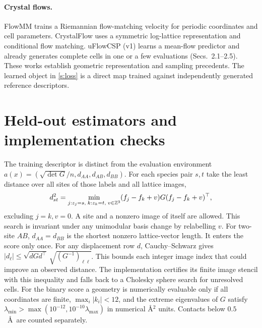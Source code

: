 \paragraph{Crystal flows.}
FlowMM \cite{flowmm} trains a Riemannian flow-matching velocity for periodic coordinates and cell parameters. CrystalFlow \cite{crystalflow} uses a symmetric log-lattice representation and conditional flow matching. uFlowCSP \cite{uflow} (v1) learns a mean-flow predictor and already generates complete cells in one or a few evaluations (Secs.~2.1--2.5). These works establish geometric representation and sampling precedents. The learned object in \eqref{s:loss} is a direct map trained against independently generated reference descriptors.

\newpage
\section{Held-out estimators and implementation checks}
The training descriptor is distinct from the evaluation environment
$a(x)=(\sqrt{\det G}/n,d_{AA},d_{AB},d_{BB})$.
For each species pair $s,t$ take the least distance over all sites of those labels and all lattice images,
\[
 d_{st}^2=\min_{j:z_j=s,\;k:z_k=t,\;v\in\mathbb Z^3}
       (f_j-f_k+v)G(f_j-f_k+v)^\top ,
\]
excluding $j=k,v=0$. A site and a nonzero image of itself are allowed. This search is invariant under any unimodular basis change by relabelling $v$. For two-site $AB$, $d_{AA}=d_{BB}$ is the shortest nonzero lattice-vector length. It enters the score only once. For any displacement row $d$, Cauchy--Schwarz gives $|d_\ell|\leq\sqrt{dGd^\top}\,\sqrt{(G^{-1})_{\ell\ell}}$. This bounds each integer image index that could improve an observed distance. The implementation certifies its finite image stencil with this inequality and falls back to a Cholesky sphere search for unresolved cells. For the binary score a geometry is numerically evaluable only if all coordinates are finite, $\max_i|k_i|<12$, and the extreme eigenvalues of $G$ satisfy $\lambda_{\min}>\max(10^{-12},10^{-10}\lambda_{\max})$ in numerical \AA$^2$ units. Contacts below $0.5$~\AA\ are counted separately.

